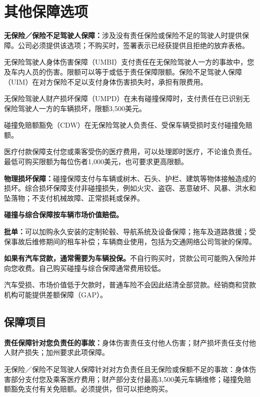 \documentclass[UTF8,fontset=none,11pt,a4paper]{ctexart}
\begin{document}
\section*{其他保障选项}
\textbf{无保险／保险不足驾驶人保障：}涉及没有责任保险或保险不足的驾驶人时提供保障。公司必须提供该选项；不购买时，签署表示已经获提供且拒绝的\allowbreak\mbox{放弃表格。}


无保险驾驶人身体伤害保障（UMBI）支付责任在无保险驾驶人一方的事故中，您及车内人员的伤害。限额可以等于或低于责任保障限额。保险不足驾驶人保障（UIM）在对方保险不足以支付身体伤害损失时，承担\allowbreak\mbox{有限费用。}


无保险驾驶人财产损坏保障（UMPD）在未有碰撞保障时，支付责任在已识别无保险驾驶人一方的车辆损坏，限额3,500美元。


碰撞免赔额豁免（CDW）在无保险驾驶人负责任、受保车辆受损时支付碰\allowbreak\mbox{撞免赔额。}


医疗付款保障支付您或乘客受伤的医疗费用，可以处理即时医疗，不论谁负责任。最低可购买限额为每位伤者1,000美元，也可要求\allowbreak\mbox{更高限额。}


\textbf{物理损坏保障：}碰撞保障支付与车辆或树木、石头、护栏、建筑等物体接触造成的损坏。综合损坏保障支付非碰撞损失，例如火灾、盗窃、恶意破坏、风暴、洪水和坠落物；不支付机械故障、正常损\allowbreak\mbox{耗或保养。}


\textbf{碰撞与综合保障按车辆市场价值赔偿。}


\textbf{批单：}可以加购永久安装的定制轮毂、导航系统及设备保障；拖车及道路救援；受保事故后维修期间的租车补偿；车辆商业使用，包括为交通网络公司驾\allowbreak\mbox{驶的保障。}


\textbf{如果有汽车贷款，通常需要为车辆投保。}不自行购买时，贷款公司可能购入保险并向您收费。自己购买碰撞与综合保障通常\allowbreak\mbox{费用较低。}


汽车受损、市场价值低于欠款时，普通车险不会因此结清全部贷款。经销商和贷款机构可能提供差额保障（GAP）。


\subsection*{保障项目}
\textbf{责任保障针对您负责任的事故：}身体伤害责任支付他人伤害；财产损坏责任支付他人财产损失；加州要求\allowbreak\mbox{此项保障。}


无保险／保险不足驾驶人保障针对对方负责任且无保险或保额不足的事故：身体伤害部分支付您及乘客医疗费用；财产部分支付最高3,500美元车辆维修；碰撞免赔额豁免支付有关免赔额。必须提供，但可以\allowbreak\mbox{拒绝购买。}
\end{document}
